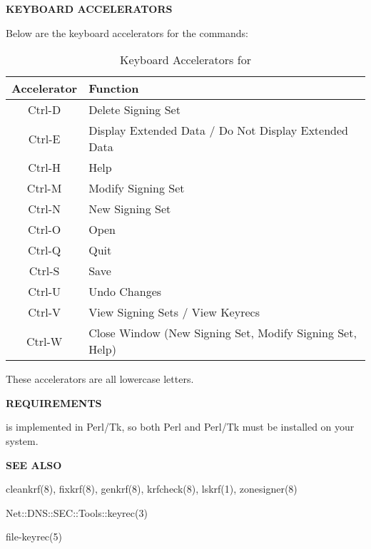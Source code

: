 \eject

{\bf KEYBOARD ACCELERATORS}

Below are the keyboard accelerators for the  commands:

\begin{table}[ht]
\begin{center}
\begin{tabular}{|c|l|}
\hline
{\bf Accelerator} & {\bf Function} \\
\hline
Ctrl-D & Delete Signing Set \\
Ctrl-E & Display Extended Data / Do Not Display Extended Data \\
Ctrl-H & Help \\
Ctrl-M & Modify Signing Set \\
Ctrl-N & New Signing Set \\
Ctrl-O & Open \\
Ctrl-Q & Quit \\
Ctrl-S & Save \\
Ctrl-U & Undo Changes \\
Ctrl-V & View Signing Sets / View Keyrecs \\
Ctrl-W & Close Window (New Signing Set, Modify Signing Set, Help) \\
\hline
\end{tabular}
\end{center}
\caption{Keyboard Accelerators for }
\end{table}

These accelerators are all lowercase letters.

{\bf REQUIREMENTS}

 is implemented in Perl/Tk, so both Perl and Perl/Tk must
be installed on your system.

{\bf SEE ALSO}

cleankrf(8),
fixkrf(8),
genkrf(8),
krfcheck(8),
lskrf(1),
zonesigner(8)

Net::DNS::SEC::Tools::keyrec(3)

file-keyrec(5)


